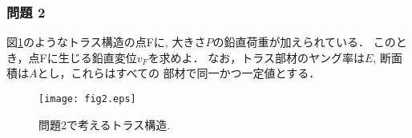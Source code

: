 \documentclass[10pt,a4j]{jarticle}
\begin{document}
\subsubsection*{問題 2}
図\ref{fig:fig2}のようなトラス構造の点Fに, 大きさ$P$の鉛直荷重が加えられている．
このとき，点Fに生じる鉛直変位$v_F$を求めよ．
なお，トラス部材のヤング率は$E$, 断面積は$A$とし，これらはすべての
部材で同一かつ一定値とする．
\begin{figure}[h]
	\begin{center}
	\texttt{[image: fig2.eps]} 
	\end{center}
	\caption{問題2で考えるトラス構造.} 
	\label{fig:fig2}
\end{figure}

\end{document}
